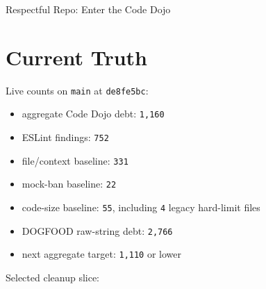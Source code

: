 \begin{CodeBlock}
Respectful Repo: Enter the Code Dojo
\end{CodeBlock}

\section{Current Truth}\label{record-233-current-truth}

Live counts on \texttt{m\allowbreak{}a\allowbreak{}i\allowbreak{}n} at \texttt{d\allowbreak{}e\allowbreak{}8\allowbreak{}f\allowbreak{}e\allowbreak{}5\allowbreak{}b\allowbreak{}c}:

\begin{itemize}
\tightlist
\item
  aggregate Code Dojo debt: \texttt{1\allowbreak{},\allowbreak{}1\allowbreak{}6\allowbreak{}0}
\item
  ESLint findings: \texttt{7\allowbreak{}5\allowbreak{}2}
\item
  file/context baseline: \texttt{3\allowbreak{}3\allowbreak{}1}
\item
  mock-ban baseline: \texttt{2\allowbreak{}2}
\item
  code-size baseline: \texttt{5\allowbreak{}5}, including \texttt{4} legacy hard-limit files
\item
  DOGFOOD raw-string debt: \texttt{2\allowbreak{},\allowbreak{}7\allowbreak{}6\allowbreak{}6}
\item
  next aggregate target: \texttt{1\allowbreak{},\allowbreak{}1\allowbreak{}1\allowbreak{}0} or lower
\end{itemize}

Selected cleanup slice:

